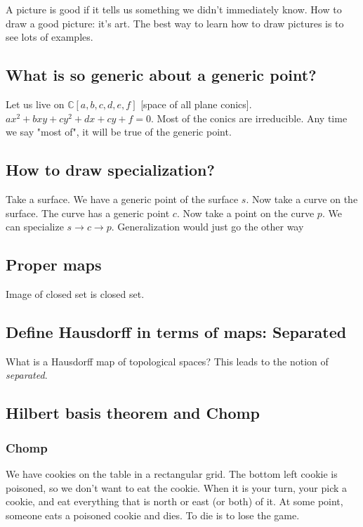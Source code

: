 \documentclass{book}
\newcommand{\C}{\ensuremath{\mathbb{C}}}
\theoremstyle{definition}
\begin{document}
A picture is good if it tells us something we didn't immediately know. How
to draw a good picture: it's art. The best way to learn how to draw pictures
is to see lots of examples. 

\subsection{What is so generic about a generic point?}

Let us live on $\C[a, b, c, d, e, f]$ [space of all plane conics].
$a x^2 + bxy + cy^2 + dx + cy + f = 0$. Most of the conics are irreducible.
Any time we say "most of", it will be true of the generic point.

\subsection{How to draw specialization?}

Take a surface. We have a generic point of the surface $s$. Now take a curve on
the surface. The curve has a generic point $c$. Now take a point on the curve $p$.
We can specialize $s \rightarrow c \rightarrow p$. Generalization would just
go the other way

\subsection{Proper maps}
Image of closed set is closed set.

\subsection{Define Hausdorff in terms of maps: Separated}
What is a Hausdorff map of topological spaces? This leads to the notion
of \emph{separated}.

\subsection{Hilbert basis theorem and Chomp}

\subsubsection{Chomp}
We have cookies on the table in a rectangular grid. The bottom left cookie
is poisoned, so we don't want to eat the cookie. When it is your turn,
your pick a cookie, and eat everything that is north or east (or both) of it.
At some point, someone eats a poisoned cookie and dies. To die is to lose the
game. 
\end{document}
